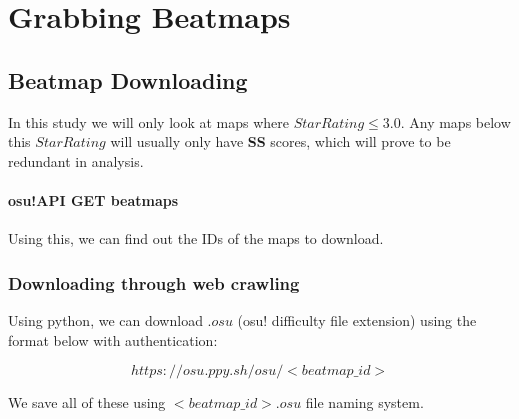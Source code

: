 

\section{Grabbing Beatmaps}

\subsection{Beatmap Downloading}

In this study we will only look at maps where $ Star Rating \leq 3.0 $. Any maps below this $Star Rating$ will usually only have \textbf{SS} scores, which will prove to be redundant in analysis.

\paragraph{osu!API GET beatmaps} Using this, we can find out the IDs of the maps to download.

\subsubsection{Downloading through web crawling}

Using python, we can download $.osu$ (osu! difficulty file extension) using the format below with authentication:

$$https://osu.ppy.sh/osu/<beatmap\_id>$$

We save all of these using $<beatmap\_id>.osu$ file naming system.


